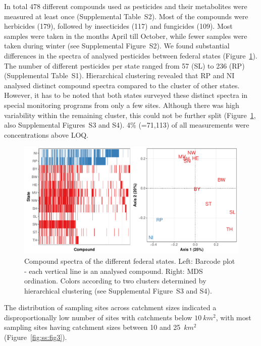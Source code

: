 In total 478 different compounds used as pesticides and their metabolites were measured at least once (Supplemental Table~S2). 
Most of the compounds were herbicides (179), followed by insecticides (117) and fungicides (109). %
Most samples were taken in the months April till October, while fewer samples were taken during winter (see Supplemental Figure~S2).
We found substantial differences in the spectra of analysed pesticides between federal states (Figure~\ref{fig:ss:fig2}).
The number of different pesticides per state ranged from 57 (SL) to 236 (RP) (Supplemental Table~S1). 
Hierarchical clustering revealed that RP and NI analysed distinct compound spectra compared to the cluster of other states. 
However, it has to be noted that both states surveyed these distinct spectra in special monitoring programs from only a few sites. 
Although there was high variability within the remaining cluster, this could not be further split (Figure~\ref{fig:ss:fig2}, also Supplemental Figures~S3 and S4).
4\% (=71,113) of all measurements were concentrations above LOQ.

\begin{landscape}
\begin{figure}[ht]
  \centering
  \vspace{1cm}
  \includegraphics[width=0.8\textheight]{chapters/smallstreams/figure2.pdf}
  \caption[Compound spectra of the different federal states.]{Compound spectra of the different federal states. Left: Barcode plot - each vertical line is an analysed compound. Right: MDS ordination. 
  Colors according to two clusters determined by hierarchical clustering (see Supplemental Figure~S3 and S4).}
  \label{fig:ss:fig2}
\end{figure}
\end{landscape}


The distribution of sampling sites across catchment sizes indicated a disproportionally low number of sites with catchments below $10~km^2$, with
most sampling sites having catchment sizes between 10 and 25~$km^2$ (Figure~\ref{fig:ss:fig3}). 


